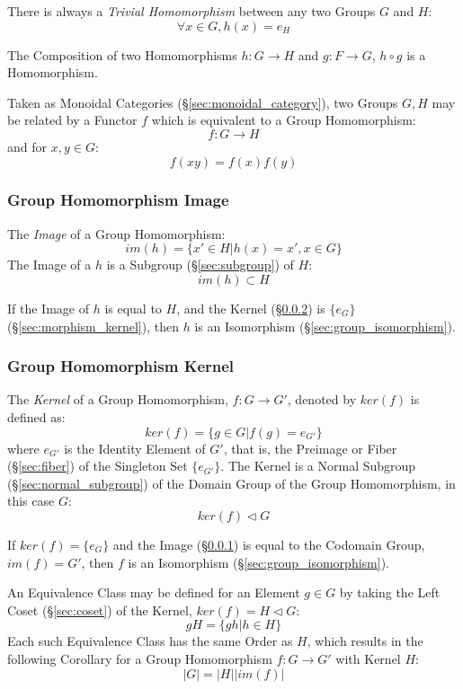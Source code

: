 There is always a \emph{Trivial Homomorphism} between any two Groups
$G$ and $H$:
\[
    \forall x \in G, h (x) = e_H
\]

The Composition of two Homomorphisms $h : G \rightarrow H$ and $g : F
\rightarrow G$, $h \circ g$ is a Homomorphism.

Taken as Monoidal Categories (\S\ref{sec:monoidal_category}), two
Groups $G, H$ may be related by a Functor $f$ which is equivalent to a
Group Homomorphism:
\[
    f : G \rightarrow H
\]
and for $x,y \in G$:
\[
    f(xy) = f(x)f(y)
\]



\subsubsection{Group Homomorphism Image}\label{sec:group_image}

The \emph{Image} of a Group Homomorphism:
\[
    im(h) = \{ x' \in H | h(x) = x', x \in G \}
\]
The Image of a $h$ is a Subgroup (\S\ref{sec:subgroup}) of $H$:
\[
    im(h) \subset H
\]

If the Image of $h$ is equal to $H$, and the Kernel
(\S\ref{sec:group_kernel}) is $\{e_G\}$ (\S\ref{sec:morphism_kernel}),
then $h$ is an Isomorphism (\S\ref{sec:group_isomorphism}).



\subsubsection{Group Homomorphism Kernel}\label{sec:group_kernel}

The \emph{Kernel} of a Group Homomorphism, $f : G \rightarrow G'$,
denoted by $ker(f)$ is defined as:
\[
    ker(f) = \{g \in G | f(g) = e_{G'}\}
\]
where $e_{G'}$ is the Identity Element of $G'$, that is, the Preimage
or Fiber (\S\ref{sec:fiber}) of the Singleton Set $\{e_{G'}\}$. The
Kernel is a Normal Subgroup (\S\ref{sec:normal_subgroup}) of the
Domain Group of the Group Homomorphism, in this case $G$:
\[
    ker(f) \triangleleft G
\]

If $ker(f) = \{e_G\}$ and the Image (\S\ref{sec:group_image}) is equal
to the Codomain Group, $im(f) = G'$, then $f$ is an Isomorphism
(\S\ref{sec:group_isomorphism}).

An Equivalence Class may be defined for an Element $g \in G$ by taking
the Left Coset (\S\ref{sec:coset}) of the Kernel, $ker(f) = H
\triangleleft G$:
\[
    gH = \{ gh | h \in H \}
\]
Each such Equivalence Class has the same Order as $H$, which results
in the following Corollary for a Group Homomorphism $f : G \rightarrow
G'$ with Kernel $H$:
\[
    |G| = |H||im(f)|
\]



